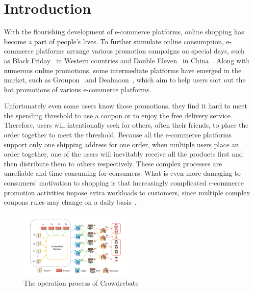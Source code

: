 \section{Introduction}

With the flourishing development of e-commerce platforms, online shopping has become a part of people's lives. To further stimulate online consumption, e-commerce platforms arrange various promotion campaigns on special days, such as Black Friday~\cite{2013Black} in Western countries and Double Eleven~\cite{double11} in China~\cite{huang2019x}. Along with numerous online promotions, some intermediate platforms have emerged in the market, such as Groupon~\cite{groupon} and Dealmoon~\cite{dealmoon}, which aim to help users sort out the hot promotions of various e-commerce platforms.

Unfortunately even some users know those promotions, they find it hard to meet the spending threshold to use a coupon or to enjoy the free delivery service. Therefore, users will intentionally seek for others, often their friends, to place the order together to meet the threshold. Because all the e-commerce platforms support only one shipping address for one order, when multiple users place an order together, one of the users will inevitably receive all the products first and then distribute them to others respectively. These complex processes are unreliable and time-consuming for consumers. What is even more damaging to consumers' motivation to shopping is that increasingly complicated e-commerce promotion activities impose extra workloads to customers, since multiple complex coupons rules may change on a daily basis~\cite{double2020}.
\begin{figure}[t]\vspace{-2ex} 
\centering %
		\includegraphics[width=0.5\textwidth]{../figure/crowdrebate process.png} %
	\caption{The operation process of Crowdrebate} %
	\label{fig:Crowdrebate} %
	\vspace{-3ex}
	\end{figure}

